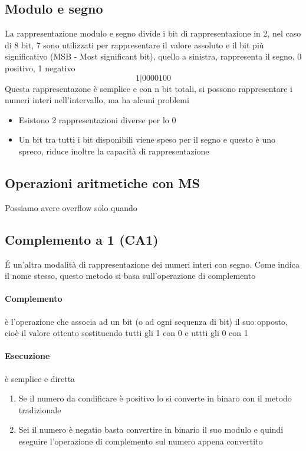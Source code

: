 \documentclass[12pt, a4paper, openany]{book}
\begin{document}
\subsection{Modulo e segno}
La rappresentazione modulo e segno divide i bit di rappresentazione in 2, nel caso di 8 bit, 7 sono utilizzati per rappresentare il valore assoluto e il bit
più significativo (MSB - Most significant bit), quello a sinistra, rappresenta il segno, 0 positivo, 1 negativo
\begin{equation}
    1 | 0 0 0 0 1 0 0
\end{equation}
Questa rappresentazone è semplice e con n bit totali, si possono rappresentare i numeri interi nell'intervallo, ma ha alcuni problemi
\begin{itemize}
    \item Esistono 2 rappresentazioni diverse per lo 0
    \item Un bit tra tutti i bit disponibili viene speso per il segno e questo è uno spreco, riduce inoltre la capacità di rappresentazione
\end{itemize}

\subsection{Operazioni aritmetiche con MS}
Possiamo avere overflow solo quando %
\subsection{Complemento a 1 (CA1)}
\'E un'altra modalità di rappresentazione dei numeri interi con segno. Come indica il nome stesso, questo metodo si basa sull'operazione di complemento

\paragraph{Complemento} è l'operazione che associa ad un bit (o ad ogni sequenza di bit) il suo opposto, cioè il valore ottento
sostituendo tutti gli 1 con 0 e uttti gli 0 con 1
\paragraph{Esecuzione} è semplice e diretta
\begin{enumerate}
    \item Se il numero da condificare è positivo lo si converte in binaro con il metodo tradizionale
    \item Sei il numero è negatio basta convertire in binario il suo modulo e quindi eseguire l'operazione di complemento sul numero appena convertito
\end{enumerate} 
\end{document}
